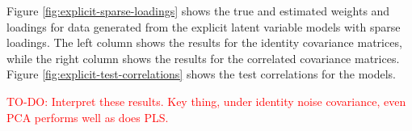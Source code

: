 Figure \ref{fig:explicit-sparse-loadings} shows the true and estimated weights and \gls{loadings} for data generated from the explicit latent variable models with sparse \gls{loadings}.
The left column shows the results for the identity covariance matrices, while the right column shows the results for the correlated covariance matrices.
Figure \ref{fig:explicit-test-correlations} shows the test correlations for the models.

\textcolor{red}{TO-DO: Interpret these results. Key thing, under identity noise covariance, even PCA performs well as does PLS. }



